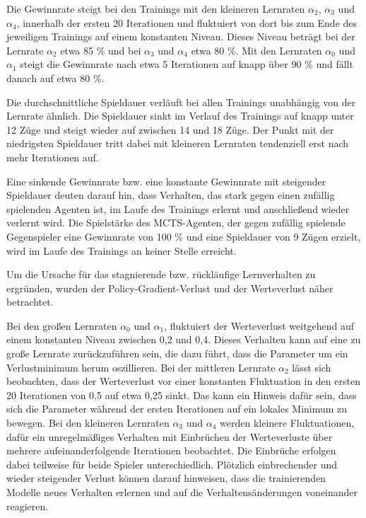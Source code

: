 Die Gewinnrate steigt bei den Trainings mit den kleineren Lernraten $\alpha_2$, $\alpha_3$ und $\alpha_4$, innerhalb der ersten 20 Iterationen und fluktuiert von dort bis zum Ende des jeweiligen Trainings auf einem konstanten Niveau. Dieses Niveau beträgt bei der Lernrate $\alpha_2$ etwa 85 \% und bei $\alpha_3$ und $\alpha_4$ etwa 80 \%. Mit den Lernraten $\alpha_0$ und $\alpha_1$ steigt die Gewinnrate nach etwa 5 Iterationen auf knapp über 90 \% und fällt danach auf etwa 80 \%.

Die durchschnittliche Spieldauer verläuft bei allen Trainings unabhängig von der Lernrate ähnlich. Die Spieldauer sinkt im Verlauf des Trainings auf knapp unter 12 Züge und steigt wieder auf zwischen 14 und 18 Züge. Der Punkt mit der niedrigsten Spieldauer tritt dabei mit kleineren Lernraten tendenziell erst nach mehr Iterationen auf.

Eine sinkende Gewinnrate bzw. eine konstante Gewinnrate mit steigender Spieldauer deuten darauf hin, dass Verhalten, das stark gegen einen zufällig spielenden Agenten ist, im Laufe des Trainings erlernt und anschließend wieder verlernt wird. Die Spielstärke des MCTS-Agenten, der gegen zufällig spielende Gegenspieler eine Gewinnrate von 100 \% und eine Spieldauer von 9 Zügen erzielt, wird im Laufe des Trainings an keiner Stelle erreicht.

Um die Ursache für das stagnierende bzw. rückläufige Lernverhalten zu ergründen, wurden der Policy-Gradient-Verlust und der Werteverlust näher betrachtet.

Bei den großen Lernraten $\alpha_0$ und $\alpha_1$, fluktuiert der Werteverlust weitgehend auf einem konstanten Niveau zwischen 0,2 und 0,4. Dieses Verhalten kann auf eine zu große Lernrate zurückzuführen sein, die dazu führt, dass die Parameter um ein Verlustminimum herum oszillieren. Bei der mittleren Lernrate $\alpha_2$ lässt sich beobachten, dass der Werteverlust vor einer konstanten Fluktuation in den ersten 20 Iterationen von 0,5 auf etwa 0,25 sinkt. Das kann ein Hinweis dafür sein, dass sich die Parameter während der ersten Iterationen auf ein lokales Minimum zu bewegen. Bei den kleineren Lernraten $\alpha_3$ und $\alpha_4$ werden kleinere Fluktuationen, dafür ein unregelmäßiges Verhalten mit Einbrüchen der Werteverluste über mehrere aufeinanderfolgende Iterationen beobachtet. Die Einbrüche erfolgen dabei teilweise für beide Spieler unterschiedlich. Plötzlich einbrechender und wieder steigender Verlust können darauf hinweisen, dass die trainierenden Modelle neues Verhalten erlernen und auf die Verhaltensänderungen voneinander reagieren.

